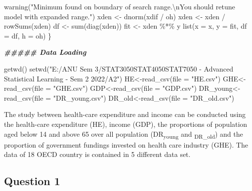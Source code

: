 \documentclass[
]{article}
\newenvironment{Shaded}{\begin{snugshade}}{\end{snugshade}}
\newcommand{\AttributeTok}[1]{\textcolor[rgb]{0.77,0.63,0.00}{#1}}
\newcommand{\DocumentationTok}[1]{\textcolor[rgb]{0.56,0.35,0.01}{\textbf{\textit{#1}}}}
\newcommand{\FunctionTok}[1]{\textcolor[rgb]{0.00,0.00,0.00}{#1}}
\newcommand{\NormalTok}[1]{#1}
\newcommand{\OtherTok}[1]{\textcolor[rgb]{0.56,0.35,0.01}{#1}}
\newcommand{\SpecialCharTok}[1]{\textcolor[rgb]{0.00,0.00,0.00}{#1}}
\newcommand{\StringTok}[1]{\textcolor[rgb]{0.31,0.60,0.02}{#1}}
\begin{document}
\begin{Shaded}
\begin{Highlighting}[]
    \FunctionTok{warning}\NormalTok{(}\StringTok{"Minimum found on boundary of search range.}\SpecialCharTok{\textbackslash{}n}\StringTok{You should retune model with expanded range."}\NormalTok{)}
\NormalTok{  xden }\OtherTok{\textless{}{-}} \FunctionTok{dnorm}\NormalTok{(xdif }\SpecialCharTok{/}\NormalTok{ oh)}
\NormalTok{  xden }\OtherTok{\textless{}{-}}\NormalTok{ xden }\SpecialCharTok{/} \FunctionTok{rowSums}\NormalTok{(xden)}
\NormalTok{  df }\OtherTok{\textless{}{-}} \FunctionTok{sum}\NormalTok{(}\FunctionTok{diag}\NormalTok{(xden))}
\NormalTok{  fit }\OtherTok{\textless{}{-}}\NormalTok{ xden }\SpecialCharTok{\%*\%}\NormalTok{ y}
  \FunctionTok{list}\NormalTok{(}\AttributeTok{x =}\NormalTok{ x, }\AttributeTok{y =}\NormalTok{ fit, }\AttributeTok{df =}\NormalTok{ df, }\AttributeTok{h =}\NormalTok{ oh)}
\NormalTok{\}}

\DocumentationTok{\#\#\#\#\# Data Loading}

\FunctionTok{getwd}\NormalTok{()}
\FunctionTok{setwd}\NormalTok{(}\StringTok{"E:/ANU Sem 3/STAT3050STAT4050STAT7050 {-} Advanced Statistical Learning {-} Sem 2 2022/A2"}\NormalTok{)}
\NormalTok{HE}\OtherTok{\textless{}{-}}\FunctionTok{read\_csv}\NormalTok{(}\AttributeTok{file =} \StringTok{"HE.csv"}\NormalTok{)}
\NormalTok{GHE}\OtherTok{\textless{}{-}}\FunctionTok{read\_csv}\NormalTok{(}\AttributeTok{file =} \StringTok{"GHE.csv"}\NormalTok{)}
\NormalTok{GDP}\OtherTok{\textless{}{-}}\FunctionTok{read\_csv}\NormalTok{(}\AttributeTok{file =} \StringTok{"GDP.csv"}\NormalTok{)}
\NormalTok{DR\_young}\OtherTok{\textless{}{-}}\FunctionTok{read\_csv}\NormalTok{(}\AttributeTok{file =} \StringTok{"DR\_young.csv"}\NormalTok{)}
\NormalTok{DR\_old}\OtherTok{\textless{}{-}}\FunctionTok{read\_csv}\NormalTok{(}\AttributeTok{file =} \StringTok{"DR\_old.csv"}\NormalTok{)}
\end{Highlighting}
\end{Shaded}

The study between health-care expenditure and income can be conducted
using the health-care expenditure (HE), income (GDP), the proportions of
population aged below 14 and above 65 over all population
(DR\textsubscript{young} and \textsubscript{DR\_old}) and the proportion
of government fundings invested on health care industry (GHE). The data
of 18 OECD country is contained in 5 different data set.

\hypertarget{question-1}{%
\subsection{Question 1}\label{question-1}}
\end{document}
